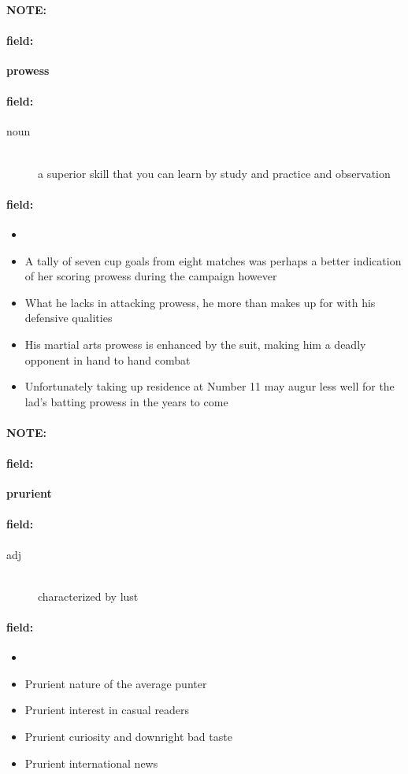 \documentclass[12pt]{article}
\newenvironment{note}{\paragraph{NOTE:}}{}
\newenvironment{field}{\paragraph{field:}}{}
\begin{document}
\begin{note}
\begin{field}
\textbf{\large prowess}
\end{field}


\begin{field}
\begin{description}
\item[noun] \hfill \\ 
a superior skill that you can learn by study and practice and observation

\end{description}
\end{field}

\begin{field}
\begin{itemize}
\item  
\item A tally of seven cup goals from eight matches was perhaps a better indication of her scoring prowess during the campaign however
\item What he lacks in attacking prowess, he more than makes up for with his defensive qualities
\item His martial arts prowess is enhanced by the suit, making him a deadly opponent in hand to hand combat
\item Unfortunately taking up residence at Number 11 may augur less well for the lad's batting prowess in the years to come
\end{itemize}
\end{field}
\end{note}
\begin{note}
\begin{field}
\textbf{\large prurient}
\end{field}


\begin{field}
\begin{description}
\item[adj] \hfill \\ 
characterized by lust

\end{description}
\end{field}

\begin{field}
\begin{itemize}
\item 
\item Prurient nature of the average punter
\item Prurient interest in casual readers
\item Prurient curiosity and downright bad taste
\item Prurient international news
\end{itemize}
\end{field}
\end{note}
\end{document}
